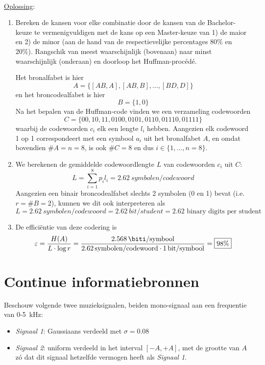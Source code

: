 \documentclass{kuburgiearticle}
\let\epsilon\varepsilon
\begin{document}
	\hfill \\
	\underline{Oplossing}:
	\begin{enumerate}
		\item Bereken de kansen voor elke combinatie door de kansen van de Bachelor-keuze te vermenigvuldigen met de kans op een Master-keuze van 1) de maior en 2) de minor (aan de hand van de respectievelijke percentages 80\% en 20\%). Rangschik van meest waarschijnlijk (bovenaan) naar minst waarschijnlijk (onderaan) en doorloop het Huffman-procédé.

		Het bronalfabet is hier \[A=\{[AB,A],[AB,B],...,[BD,D]\}\] en het broncodealfabet is hier \[ B=\{1,0\} \] Na het bepalen van de Huffman-code vinden we een verzameling codewoorden \[ \boxed{C=\{00,10,11,0100,0101,0110,01110,01111\}} \] waarbij de codewoorden \(c_i\) elk een lengte \(l_i\) hebben. Aangezien elk codewoord 1 op 1 correspondeert met een symbool \(a_i\) uit het bronalfabet \(A\), en omdat bovendien \(\#A=n=8\), is ook \(\#C=8\) en dus \(i \in \{1,...,n=8\}\).

		\item We berekenen de gemiddelde codewoordlengte \(L\) van codewoorden \(c_i\) uit \(C\): \[ L=\sum_{i=1}^{8}p_il_i = \boxed{\SI{2.62}{symbolen/codewoord}} \]Aangezien een binair broncodealfabet slechts 2 symbolen (0 en 1) bevat (i.e. \(r=\#B=2\)), kunnen we dit ook interpreteren als \[L=\SI{2.62}{symbolen/codewoord}=\SI{2.62}{bit\per student}=2.62 \text{ binary digits per student} \]

		\item De efficiëntie van deze codering is \[\epsilon = \frac{H(A)}{L\cdot \log{r}}
		= \frac{\SI{2.568}{\biti \per symbool}}{\SI{2.62}{symbolen \per codewoord}\cdot \SI{1}{bit \per symbool}} = \boxed{98\%} \]
	\end{enumerate}

	\newpage

	\section{Continue informatiebronnen}

	Beschouw volgende twee muzieksignalen, beiden mono-signaal aan een frequentie van 0-\SI{5}{\kilo \hertz}:
	\begin{itemize}
		\item \textit{Signaal 1}: Gaussiaans verdeeld met \( \sigma=0.08 \)
		\item \textit{Signaal 2}: uniform verdeeld in het interval \( [-A,+A] \), met de grootte van \( A \) zó dat dit signaal hetzelfde vermogen heeft als \textit{Signaal 1}.
	\end{itemize}
\end{document}
